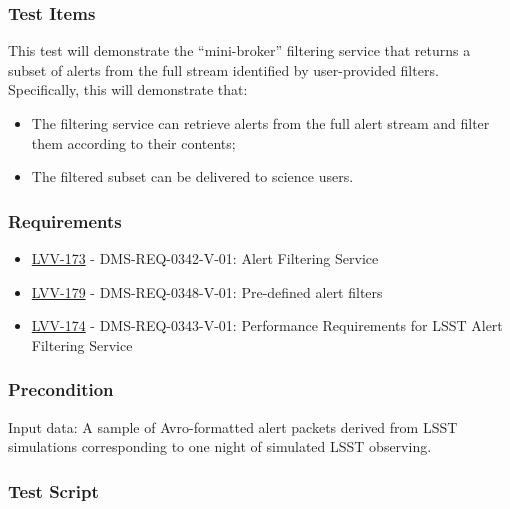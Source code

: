 \subsubsection{Test Items}\label{test-items-8}

This test will demonstrate the ``mini-broker'' filtering service that
returns a subset of alerts from the full stream identified by
user-provided filters.\\[2\baselineskip]Specifically, this will
demonstrate that:\\

\begin{itemize}
\tightlist
\item
  The filtering service can retrieve alerts from the full alert stream
  and filter them according to their contents; ~ ~
\item
  The filtered subset can be delivered to science users.
\end{itemize}

\subsubsection{Requirements}\label{requirements-8}

\begin{itemize}
\tightlist
\item
  \href{https://jira.lsstcorp.org/browse/LVV-173}{LVV-173} -
  DMS-REQ-0342-V-01: Alert Filtering Service
\item
  \href{https://jira.lsstcorp.org/browse/LVV-179}{LVV-179} -
  DMS-REQ-0348-V-01: Pre-defined alert filters
\item
  \href{https://jira.lsstcorp.org/browse/LVV-174}{LVV-174} -
  DMS-REQ-0343-V-01: Performance Requirements for LSST Alert Filtering
  Service
\end{itemize}

\subsubsection{Precondition}\label{precondition-7}

Input data: A sample of Avro-formatted alert packets derived from LSST
simulations corresponding to one night of simulated LSST observing.

\subsubsection{Test Script}\label{test-script-8}


